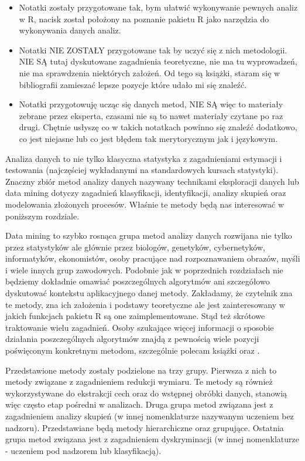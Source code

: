 \documentclass[polish,]{book}
\begin{document}
\begin{itemize}
\item
  Notatki zostały przygotowane tak, bym ułatwić wykonywanie pewnych analiz
  w R, nacisk został położony na poznanie pakietu R jako narzędzia do wykonywania danych analiz.
\item
  Notatki NIE ZOSTAŁY przygotowane tak by uczyć się z nich metodologii.
  NIE SĄ tutaj dyskutowane zagadnienia teoretyczne, nie ma tu wyprowadzeń,
  nie ma sprawdzenia niektórych założeń. Od tego są książki, staram się w bibliografii zamieszać lepsze pozycje które udało mi się znaleźć.
\item
  Notatki przygotowuję ucząc się danych metod, NIE SĄ więc to materiały zebrane przez eksperta, czasami nie są to nawet materiały czytane po raz drugi.
  Chętnie usłyszę co w takich notatkach powinno się znaleźć dodatkowo, co jest
  niejasne lub co jest błędem tak merytorycznym jak i językowym.
\end{itemize}

Analiza danych to nie tylko klasyczna statystyka z zagadnieniami estymacji i testowania (najczęściej wykładanymi na standardowych kursach statystyki). Znaczny
zbiór metod analizy danych nazywany technikami eksploracji danych lub data mining dotyczy zagadnień klasyfikacji, identyfikacji, analizy skupień oraz modelowania
złożonych procesów. Właśnie te metody będą nas interesować w poniższym rozdziale.

Data mining to szybko rosnąca grupa metod analizy danych rozwijana nie tylko
przez statystyków ale głównie przez biologów, genetyków, cybernetyków, informatyków, ekonomistów, osoby pracujące nad rozpoznawaniem obrazów, myśli i wiele
innych grup zawodowych. Podobnie jak w poprzednich rozdziałach nie będziemy dokładnie omawiać poszczególnych algorytmów ani szczegółowo dyskutować kontekstu
aplikacyjnego danej metody. Zakładamy, że czytelnik zna te metody, zna ich założenia i podstawy teoretyczne ale jest zainteresowany w jakich funkcjach pakietu R
są one zaimplementowane. Stąd też skrótowe traktowanie wielu zagadnień. Osoby
szukające więcej informacji o sposobie działania poszczególnych algorytmów znajdą
z pewnością wiele pozycji poświęconym konkretnym metodom, szczególnie polecam
książki \citep{KC2005} oraz \citep{HTF2001}.

Przedstawione metody zostały podzielone na trzy grupy. Pierwsza z nich to metody związane z zagadnieniem redukcji wymiaru. Te metody są również wykorzystywane do ekstrakcji cech oraz do wstępnej obróbki danych, stanowią więc często
etap pośredni w analizach. Druga grupa metod związana jest z zagadnieniem analizy
skupień (w innej nomenklaturze nazywanym uczeniem bez nadzoru). Przedstawiane będą metody hierarchiczne oraz grupujące. Ostatnia grupa metod związana jest
z zagadnieniem dyskryminacji (w innej nomenklaturze - uczeniem pod nadzorem lub
klasyfikacją).
\end{document}
